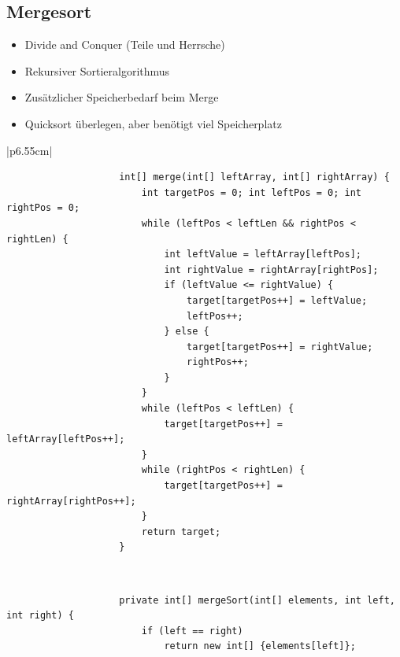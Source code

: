 \documentclass[a4paper, landscape, 8pt]{scrartcl}
\begin{document}
\begin{multicols*}{4}
            \subsection{Mergesort}
                \begin{itemize}
                    \item Divide and Conquer (Teile und Herrsche)
                    \item Rekursiver Sortieralgorithmus
                    \item Zusätzlicher Speicherbedarf beim Merge
                    \item Quicksort überlegen, aber benötigt viel Speicherplatz
                \end{itemize}
                \begin{tabular}{|p{6.55cm}|}
                    \hline
                    \begin{lstlisting}
                    int[] merge(int[] leftArray, int[] rightArray) {
                        int targetPos = 0; int leftPos = 0; int rightPos = 0;
                        while (leftPos < leftLen && rightPos < rightLen) {
                            int leftValue = leftArray[leftPos];
                            int rightValue = rightArray[rightPos];
                            if (leftValue <= rightValue) {
                                target[targetPos++] = leftValue;
                                leftPos++;
                            } else {
                                target[targetPos++] = rightValue;
                                rightPos++;
                            }
                        }
                        while (leftPos < leftLen) {
                            target[targetPos++] = leftArray[leftPos++];
                        }
                        while (rightPos < rightLen) {
                            target[targetPos++] = rightArray[rightPos++];
                        }
                        return target;
                    }
                    \end{lstlisting} \\
                    \hline
                    \begin{lstlisting}
                    private int[] mergeSort(int[] elements, int left, int right) {
                        if (left == right)
                            return new int[] {elements[left]};


\end{lstlisting}
\end{tabular}
\end{multicols*}
\end{document}
